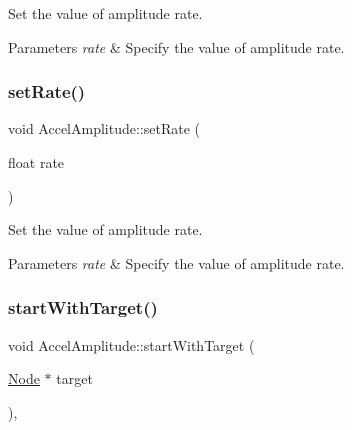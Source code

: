 Set the value of amplitude rate. 


\begin{DoxyParams}{Parameters}
{\em rate} & Specify the value of amplitude rate. \\
\hline
\end{DoxyParams}
\mbox{\label{classAccelAmplitude_a9d6078516cdd0489b0c4b2665e634e3f}} 
\subsubsection{\texorpdfstring{set\+Rate()}{setRate()}\hspace{0.1cm}{\footnotesize\ttfamily [2/2]}}
{\footnotesize\ttfamily void Accel\+Amplitude\+::set\+Rate (\begin{DoxyParamCaption}\item[{float}]{rate }\end{DoxyParamCaption})\hspace{0.3cm}{\ttfamily [inline]}}



Set the value of amplitude rate. 


\begin{DoxyParams}{Parameters}
{\em rate} & Specify the value of amplitude rate. \\
\hline
\end{DoxyParams}
\mbox{\label{classAccelAmplitude_ae8d088ea86d2ade5282f10a785d1e0a8}} 
\subsubsection{\texorpdfstring{start\+With\+Target()}{startWithTarget()}\hspace{0.1cm}{\footnotesize\ttfamily [1/2]}}
{\footnotesize\ttfamily void Accel\+Amplitude\+::start\+With\+Target (\begin{DoxyParamCaption}\item[{\hyperlink{classNode}{Node} $\ast$}]{target }\end{DoxyParamCaption})\hspace{0.3cm}{\ttfamily [override]}, {\ttfamily [virtual]}}

